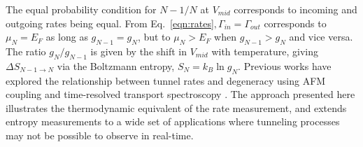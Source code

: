 \documentclass[twocolumn,showpacs,amsmath,amssymb,prl,aps,superscriptaddress]{revtex4-1}
\begin{document}
The equal probability condition for $N-1/N$ at $V_{mid}$ corresponds to  incoming and outgoing rates being equal.  From Eq.~\ref{eqn:rates}$, \Gamma_{in} = \Gamma_{out}$ corresponds to $\mu_{N} = E_F$ as long as $g_{N-1}=g_{N}$, but to $\mu_{N} > E_F$ when $g_{N-1} > g_{N}$ and vice versa.   The ratio $g_{N}/g_{N-1}$ is given by the shift in $V_{mid}$ with temperature, giving $\Delta S_{N-1\rightarrow N}$ via the Boltzmann entropy, $S_{N}=k_{B} \ln{g_N}$. Previous works have explored the relationship between tunnel rates and degeneracy using AFM coupling and time-resolved transport spectroscopy \cite{Cockins2010, Bennett2010, Beckel2014, Hofmann2016}. The approach presented here illustrates the thermodynamic equivalent of the rate measurement, and extends entropy measurements to a wide set of applications where tunneling processes may not be possible to observe in real-time.

\end{document}
